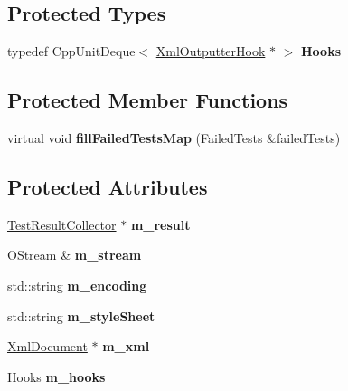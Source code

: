 \subsection*{Protected Types}
\begin{DoxyCompactItemize}
\item 
typedef Cpp\+Unit\+Deque$<$ \hyperlink{class_xml_outputter_hook}{Xml\+Outputter\+Hook} $\ast$ $>$ {\bfseries Hooks}\hypertarget{class_xml_outputter_a721fa60bda8d779457ae8e429be21d74}{}\label{class_xml_outputter_a721fa60bda8d779457ae8e429be21d74}

\end{DoxyCompactItemize}
\subsection*{Protected Member Functions}
\begin{DoxyCompactItemize}
\item 
virtual void {\bfseries fill\+Failed\+Tests\+Map} (Failed\+Tests \&failed\+Tests)\hypertarget{class_xml_outputter_a063afe5aaec2936d53ba58c45b5bdb54}{}\label{class_xml_outputter_a063afe5aaec2936d53ba58c45b5bdb54}

\end{DoxyCompactItemize}
\subsection*{Protected Attributes}
\begin{DoxyCompactItemize}
\item 
\hyperlink{class_test_result_collector}{Test\+Result\+Collector} $\ast$ {\bfseries m\+\_\+result}\hypertarget{class_xml_outputter_a982002691814b46b0fe8ca79a74d8895}{}\label{class_xml_outputter_a982002691814b46b0fe8ca79a74d8895}

\item 
O\+Stream \& {\bfseries m\+\_\+stream}\hypertarget{class_xml_outputter_a6f7eb773760301d381ba7f3ca5729bca}{}\label{class_xml_outputter_a6f7eb773760301d381ba7f3ca5729bca}

\item 
std\+::string {\bfseries m\+\_\+encoding}\hypertarget{class_xml_outputter_a193e314a66971eec760045fc20e5a2d1}{}\label{class_xml_outputter_a193e314a66971eec760045fc20e5a2d1}

\item 
std\+::string {\bfseries m\+\_\+style\+Sheet}\hypertarget{class_xml_outputter_a83e00800a42c2a62127e335f28b58230}{}\label{class_xml_outputter_a83e00800a42c2a62127e335f28b58230}

\item 
\hyperlink{class_xml_document}{Xml\+Document} $\ast$ {\bfseries m\+\_\+xml}\hypertarget{class_xml_outputter_a7c789c60c2031edc2527e75e736612cb}{}\label{class_xml_outputter_a7c789c60c2031edc2527e75e736612cb}

\item 
Hooks {\bfseries m\+\_\+hooks}\hypertarget{class_xml_outputter_a54643e72aed488db22338cb878be2c81}{}\label{class_xml_outputter_a54643e72aed488db22338cb878be2c81}

\end{DoxyCompactItemize}


